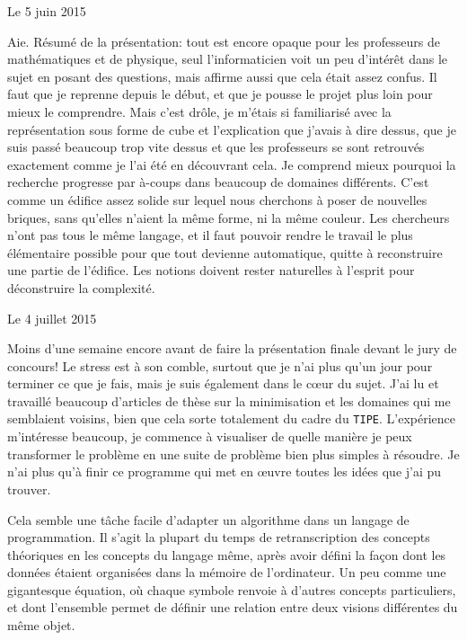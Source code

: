 \documentclass[12pt,final]{report} %
\newcommand{\datemarge}[1]{%
   \newpage
   
        {\hfill{\color{blue}#1}}

}
\newcommand{\majuscule}[1]{{\large \texttt{#1}}}
\begin{document}
\begin{cursive}
{\datemarge{Le 5 juin 2015}

Aie. Résumé de la présentation: tout est encore opaque pour les professeurs de mathématiques et de physique, seul l'informaticien voit un peu d'intérêt dans le sujet en posant des questions, mais affirme aussi que cela était assez confus. 
Il faut que je reprenne depuis le début, et que je pousse le projet plus loin pour mieux le comprendre.
Mais c'est drôle, je m'étais si familiarisé avec la représentation sous forme de cube et l'explication que j'avais à dire dessus, que je suis passé beaucoup trop vite dessus et que les professeurs se sont retrouvés exactement comme je l'ai été en découvrant cela.
Je comprend mieux pourquoi la recherche progresse par à-coups dans beaucoup de domaines différents. 
C'est comme un édifice assez solide sur lequel nous cherchons à poser de nouvelles briques, sans qu'elles n'aient la même forme, ni la même couleur. 
Les chercheurs n'ont pas tous le même langage, et il faut pouvoir rendre le travail le plus élémentaire possible pour que tout devienne automatique, quitte à reconstruire une partie de l'édifice.
Les notions doivent rester naturelles à l'esprit pour déconstruire la complexité.




\datemarge{Le 4 juillet 2015}

Moins d'une semaine encore avant de faire la présentation finale devant le jury de concours!
Le stress est à son comble, surtout que je n'ai plus qu'un jour pour terminer ce que je fais, mais je suis également dans le c\oe{}ur du sujet.
J'ai lu et travaillé beaucoup d'articles de thèse sur la minimisation et les domaines qui me semblaient voisins, bien que cela sorte totalement du cadre du \majuscule{TIPE}.
L'expérience m'intéresse beaucoup, je commence à visualiser de quelle manière je peux transformer le problème en une suite de problème bien plus simples à résoudre.
Je n'ai plus qu'à finir ce programme qui met en \oe{}uvre toutes les idées que j'ai pu trouver. 

Cela semble une tâche facile d'adapter un algorithme dans un langage de programmation.
Il s'agit la plupart du temps de retranscription des concepts théoriques en les concepts du langage même, après avoir défini la façon dont les données étaient organisées dans la mémoire de l'ordinateur.
Un peu comme une gigantesque équation, où chaque symbole renvoie à d'autres concepts particuliers, et dont l'ensemble permet de définir une relation entre deux visions différentes du même objet.

}
\end{cursive}
\end{document}
